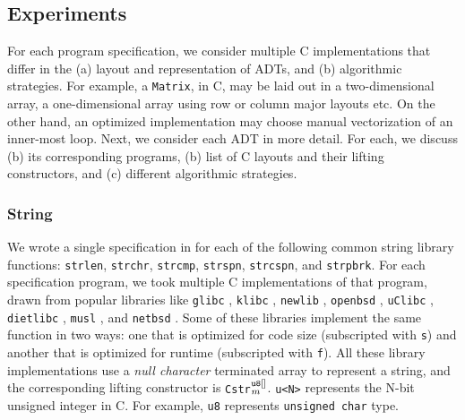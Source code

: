 \subsection{Experiments}
For each \SpecL{} program specification, we consider multiple
C implementations that differ in the (a) layout and representation of ADTs, and
(b) algorithmic strategies. For example, a {\tt Matrix}, in C, may be laid out
in a two-dimensional array, a one-dimensional array using row or column major
layouts etc. On the other hand, an optimized implementation may choose manual vectorization
of an inner-most loop. Next, we consider each ADT in more detail. For each,
we discuss (b) its corresponding programs, (b) list of C layouts and their lifting
constructors, and (c) different algorithmic strategies.




\subsubsection{String} We wrote a single specification in \SpecL{} for each of the
following
common string library functions: {\tt strlen}, {\tt strchr}, {\tt strcmp}, {\tt strspn},
{\tt strcspn}, and {\tt strpbrk}.  For each specification
program, we took multiple C implementations of that program, drawn from popular
libraries like {\tt glibc} \cite{glibc}, {\tt klibc} \cite{klibc}, {\tt newlib} \cite{newlib},
{\tt openbsd} \cite{openbsdlibc}, {\tt uClibc} \cite{uclibc},
{\tt dietlibc} \cite{dietlibc}, {\tt musl} \cite{musl}, and {\tt netbsd} \cite{netbsd}.
Some of these libraries implement the same function in two ways: one that is optimized
for code size (subscripted with {\tt s}) and another that is optimized for runtime (subscripted with {\tt f}).
All these library implementations use a {\em null character} terminated array to represent
a string, and the
corresponding lifting constructor is {\tt Cstr}$^{\tt u8[]}_m$.
{\tt u<N>} represents the N-bit unsigned integer in C.
For example, {\tt u8} represents {\tt unsigned char} type.

